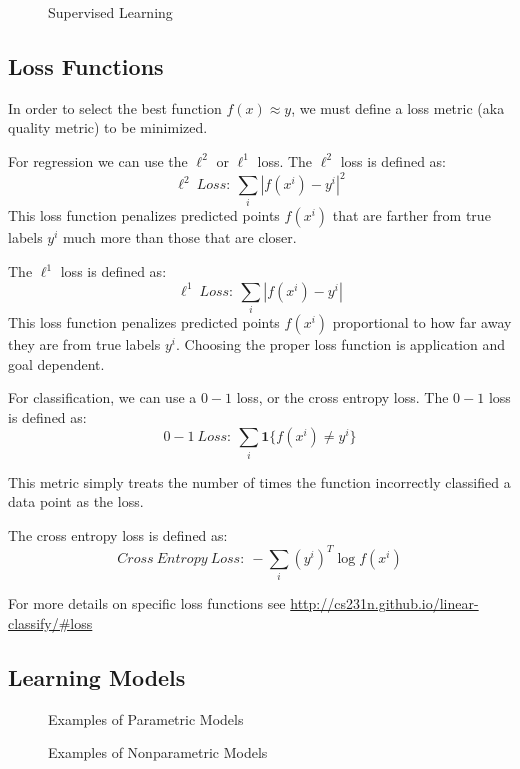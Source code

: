 \documentclass[twoside]{article}
\begin{document}
\begin{figure}[!ht]%
    \centering
    \qquad
    \caption{Supervised Learning}%
    \label{fig:supervised_learning}%
\end{figure}

\subsection{Loss Functions}

In order to select the best function $f(x) \approx y$, we must define a loss metric (aka quality metric) to be minimized.

For regression we can use the $\ell^2$ or $\ell^1$ loss. The $\ell^2$ loss is defined as:
$$\ell^2 \ Loss: \ \sum_{i} |f(x^i) - y^i|^2$$
This loss function penalizes predicted points $f(x^i)$ that are farther from true labels $y^i$ much more than those that are closer.

The $\ell^1$ loss is defined as:
$$ \ell^1 \ Loss: \ \sum_{i} |f(x^i) - y^i|$$
This loss function penalizes predicted points $f(x^i)$ proportional to how far away they are from true labels $y^i$. Choosing the proper loss function is application and goal dependent.

For classification, we can use a $0-1$ loss, or the cross entropy loss. The $0-1$ loss is defined as:
$$0-1 \ Loss: \ \sum_{i} \textbf{1} \{f(x^i) \neq y^i \}$$

This metric simply treats the number of times the function incorrectly classified a data point as the loss.

The cross entropy loss is defined as:
$$Cross\ Entropy\ Loss: \ -\sum_{i} (y^i)^T \log{f(x^i)}$$

For more details on specific loss functions see \url{http://cs231n.github.io/linear-classify/#loss}

\subsection{Learning Models}

\begin{figure}[!ht]%
    \centering
    \qquad
    \caption{Examples of Parametric Models}%
    \label{fig:parametric_models}%
    \qquad
    \caption{Examples of Nonparametric Models}%
    \label{fig:nonparametric_models}%
\end{figure}
\end{document}
